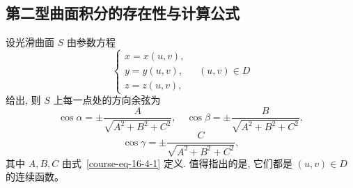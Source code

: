 \documentclass[UTF8,12pt,a4paper,fontset=fandol]{ctexart}
\begin{document}
\subsection{第二型曲面积分的存在性与计算公式}

设光滑曲面 $S$ 由参数方程
\begin{equation}
  \begin{cases}
    x=x(u,v),\\
    y=y(u,v),\\
    z=z(u,v),
  \end{cases}\quad (u,v)\in D
  \label{course-eq-16-4-3}
\end{equation}
给出, 则 $S$ 上每一点处的方向余弦为
\[
  \cos\alpha=\pm\frac{A}{\sqrt{A^2+B^2+C^2}},\quad
  \cos\beta=\pm\frac{B}{\sqrt{A^2+B^2+C^2}},
\]
\[
  \cos\gamma=\pm\frac{C}{\sqrt{A^2+B^2+C^2}},
\]
其中 $A,B,C$ 由式~\eqref{course-eq-16-4-1}  定义. 值得指出的是, 它们都是 $(u,v)\in D$ 的连续函数。
\end{document}
